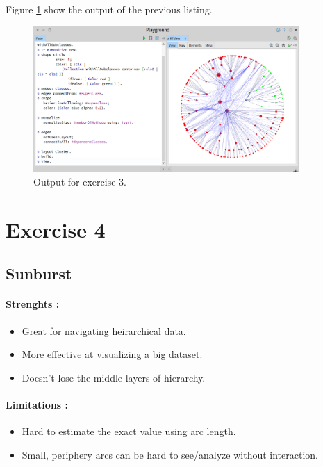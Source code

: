 \documentclass[a4paper,11pt]{report}
\begin{document}
Figure \ref{fig:ex3} show the output of the previous listing.

\begin{figure}[h]
  \centering
  \includegraphics[width=0.9\textwidth]{ex3.png}
  \caption{Output for exercise 3.}
  \label{fig:ex3}
\end{figure}


\section*{Exercise 4}

\subsection*{Sunburst}

\paragraph{Strenghts : }

\begin{itemize}
\item  Great for navigating heirarchical data.
\item  More effective at visualizing a big dataset.
\item  Doesn’t lose the middle layers of hierarchy.
\end{itemize}

\paragraph{Limitations : }

\begin{itemize}
\item Hard to estimate the exact value using arc length.
\item Small, periphery arcs can be hard to see/analyze without interaction.
\end{itemize}
\end{document}

